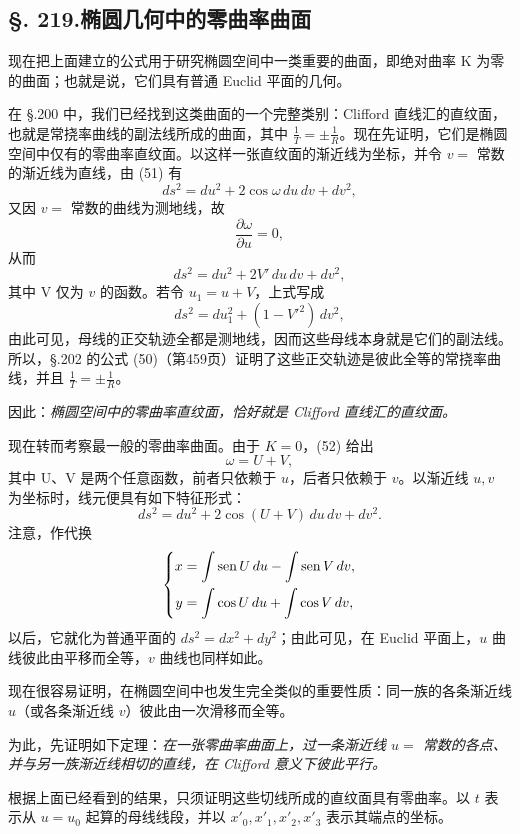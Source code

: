 \subsection*{\S. 219.\quad 椭圆几何中的零曲率曲面}

现在把上面建立的公式用于研究椭圆空间中一类重要的曲面，即绝对曲率 K 为零的曲面；也就是说，它们具有普通 Euclid 平面的几何。

在 \S.200 中，我们已经找到这类曲面的一个完整类别：Clifford 直线汇的直纹面，也就是常挠率曲线的副法线所成的曲面，其中
$\frac1T=\pm\frac1R$。现在先证明，它们是椭圆空间中仅有的零曲率直纹面。以这样一张直纹面的渐近线为坐标，并令 $v=$ 常数的渐近线为直线，由 (51) 有
\[
ds^2=du^2+2\cos\omega\,du\,dv+dv^2,
\]
又因 $v=$ 常数的曲线为测地线，故
\[
\frac{\partial\omega}{\partial u}=0,
\]
从而
\[
ds^2=du^2+2V'\,du\,dv+dv^2,
\]
其中 V 仅为 $v$ 的函数。若令 $u_1=u+V$，上式写成
\[
ds^2=du_1^2+(1-V'^2)\,dv^2,
\]
由此可见，母线的正交轨迹全都是测地线，因而这些母线本身就是它们的副法线。所以，\S.202 的公式 (50)（第459页）证明了这些正交轨迹是彼此全等的常挠率曲线，并且
$\frac1T=\pm\frac1R$。

因此：\emph{椭圆空间中的零曲率直纹面，恰好就是 Clifford 直线汇的直纹面。}

现在转而考察最一般的零曲率曲面。由于 $K=0$，(52) 给出
\[
\omega=U+V,
\]
其中 U、V 是两个任意函数，前者只依赖于 $u$，后者只依赖于 $v$。以渐近线 $u,v$ 为坐标时，线元便具有如下特征形式：
\[
\tag{53}
ds^2=du^2+2\cos(U+V)\,du\,dv+dv^2.
\]
注意，作代换
\[
\left\{
\begin{aligned}
x&=\int\operatorname{sen} U\,du-\int\operatorname{sen} V\,dv,\\
y&=\int\cos U\,du+\int\cos V\,dv,
\end{aligned}\right.
\]
以后，它就化为普通平面的 $ds^2=dx^2+dy^2$；由此可见，在 Euclid 平面上，$u$ 曲线彼此由平移而全等，$v$ 曲线也同样如此。

现在很容易证明，在椭圆空间中也发生完全类似的重要性质：同一族的各条渐近线 $u$（或各条渐近线 $v$）彼此由一次滑移而全等。

为此，先证明如下定理：\emph{在一张零曲率曲面上，过一条渐近线 $u=$ 常数的各点、并与另一族渐近线相切的直线，在 Clifford 意义下彼此平行。}

根据上面已经看到的结果，只须证明这些切线所成的直纹面具有零曲率。以 $t$ 表示从 $u=u_0$ 起算的母线线段，并以 $x'_0,x'_1,x'_2,x'_3$ 表示其端点的坐标。

